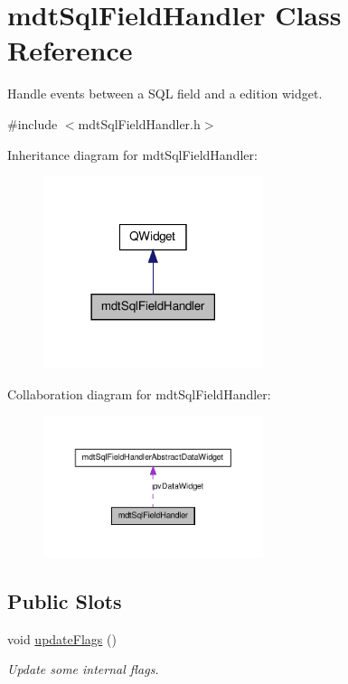 \hypertarget{classmdt_sql_field_handler}{\section{mdt\-Sql\-Field\-Handler Class Reference}
\label{classmdt_sql_field_handler}
}


Handle events between a S\-Q\-L field and a edition widget.  




{\ttfamily \#include $<$mdt\-Sql\-Field\-Handler.\-h$>$}



Inheritance diagram for mdt\-Sql\-Field\-Handler\-:
\nopagebreak
\begin{figure}[H]
\begin{center}
\leavevmode
\includegraphics[width=182pt]{classmdt_sql_field_handler__inherit__graph}
\end{center}
\end{figure}


Collaboration diagram for mdt\-Sql\-Field\-Handler\-:
\nopagebreak
\begin{figure}[H]
\begin{center}
\leavevmode
\includegraphics[width=182pt]{classmdt_sql_field_handler__coll__graph}
\end{center}
\end{figure}
\subsection*{Public Slots}
\begin{DoxyCompactItemize}
\item 
void \hyperlink{classmdt_sql_field_handler_a7bb4e75ab209bdd2609cf458b5ce8868}{update\-Flags} ()
\begin{DoxyCompactList}\small\item\em Update some internal flags. \end{DoxyCompactList}\end{DoxyCompactItemize}
